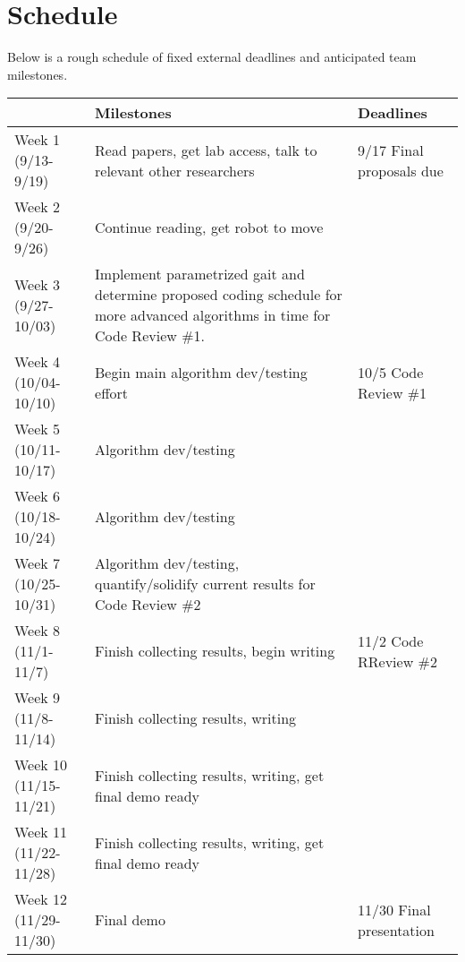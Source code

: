 \section{Schedule}

Below is a rough schedule of fixed external deadlines and anticipated
team milestones.

\begin{center}
\begin{tabular}{|l||p{2.5in}|p{1.5in}|}
\hline
                        & {\bf Milestones} & {\bf Deadlines}
\\ \hline

Week 1 (9/13-9/19)    & Read papers, get lab access, talk to relevant other researchers & 9/17 Final proposals due
\\ \hline

Week 2 (9/20-9/26)    & Continue reading, get robot to move &
\\ \hline

Week 3 (9/27-10/03)   & Implement parametrized gait and determine proposed coding schedule for more advanced algorithms in time for Code Review \#1. &
\\ \hline

Week 4 (10/04-10/10)  & Begin main algorithm dev/testing effort & 10/5 Code Review \#1
\\ \hline

Week 5 (10/11-10/17)  & Algorithm dev/testing &
\\ \hline

Week 6 (10/18-10/24)  & Algorithm dev/testing &
\\ \hline

Week 7 (10/25-10/31)  & Algorithm dev/testing, quantify/solidify current results for Code Review \#2 &
\\ \hline

Week 8 (11/1-11/7)    & Finish collecting results, begin writing & 11/2 Code RReview \#2
\\ \hline

Week 9 (11/8-11/14)   & Finish collecting results, writing &
\\ \hline

Week 10 (11/15-11/21) & Finish collecting results, writing, get final demo ready &
\\ \hline

Week 11 (11/22-11/28) & Finish collecting results, writing, get final demo ready  &
\\ \hline

Week 12 (11/29-11/30) & Final demo  & 11/30 Final presentation
\\ \hline
\end{tabular}
\end{center}
